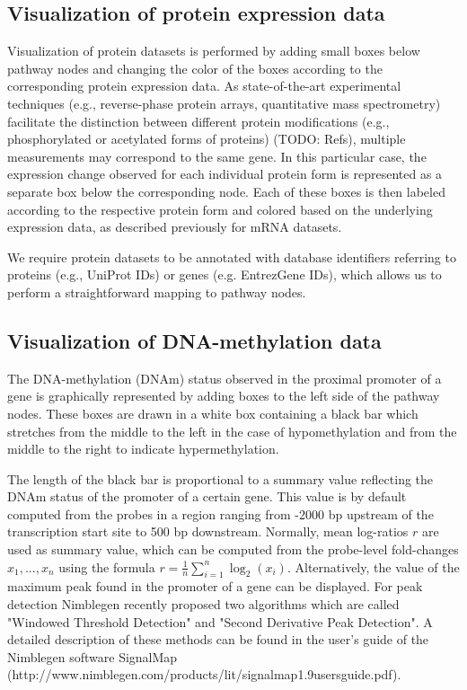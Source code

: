 \documentclass{bioinfo}
\begin{document}
\subsection{Visualization of protein expression data}

Visualization of protein datasets is performed by adding small boxes below pathway nodes and
changing the color of the boxes according to the corresponding protein expression data. As state-of-the-art 
experimental techniques (e.g., reverse-phase protein arrays, quantitative mass spectrometry) 
facilitate the distinction between different protein modifications (e.g., phosphorylated or 
acetylated forms of proteins) (TODO: Refs), multiple measurements may correspond to the same gene. 
In this particular case, the expression change observed for each individual protein form is represented 
as a separate box below the corresponding node. Each of these boxes is then labeled according to the 
respective protein form and colored based on the underlying expression data, as described previously 
for mRNA datasets.

We require protein datasets to be annotated with database identifiers referring to proteins (e.g.,
UniProt IDs) or genes (e.g. EntrezGene IDs), which allows us to perform a straightforward mapping to
pathway nodes.

\subsection{Visualization of DNA-methylation data}

The DNA-methylation (DNAm) status observed in the proximal promoter of a gene is graphically
represented by adding boxes to the left side of the pathway nodes. These boxes are drawn in a white
box containing a black bar which stretches from the middle to the left in the case of
hypomethylation and from the middle to the right to indicate hypermethylation.

The length of the black bar is proportional to a summary value reflecting the DNAm status of the
promoter of a certain gene.  This value is by default computed from the probes in a region ranging
from -2000 bp upstream of the transcription start site to 500 bp downstream. Normally, mean
log-ratios $r$ are used as summary value, which can be computed from the probe-level fold-changes
$x_1,...,x_n$ using the formula $r=\frac{1}{n}\sum\limits_{i=1}^n\log_2(x_i)$. Alternatively, the
value of the maximum peak found in the promoter of a gene can be displayed. For peak detection
Nimblegen recently proposed two algorithms which are called "Windowed Threshold Detection" and
"Second Derivative Peak Detection". A detailed description of these methods can be found in the
user's guide of the Nimblegen software SignalMap
(http://www.nimblegen.com/products/lit/signalmap1.9usersguide.pdf).
\end{document}
